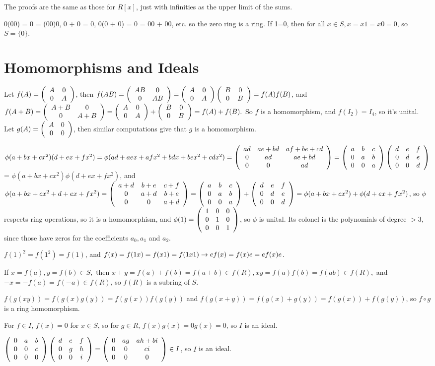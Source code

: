 \documentclass[11pt, oneside]{article}   	%
\begin{document}
\item The proofs are the same as those for $R[x]$, just with infinities as the upper limit of the sums.
\item 0(00) = 0 = (00)0, 0 + 0 = 0, 0(0 + 0) = 0 = 00 + 00, etc. so the zero ring is a ring. If 1=0, then for all $x \in S, x = x1 = x0 = 0$, so $S = \{0\}$.
\ee 
\section{Homomorphisms and Ideals}
\be
\item Let $f(A) = \left( \begin{array}{ccc} A & 0 \\ 0 & A \end{array} \right)$, then $f(AB) = \left( \begin{array}{ccc} AB & 0 \\ 0 & AB \end{array} \right) = \left( \begin{array}{ccc} A & 0 \\ 0 & A \end{array} \right)\left( \begin{array}{ccc} B & 0 \\ 0 & B \end{array} \right) = f(A)f(B)$, and $f(A + B) = \left( \begin{array}{ccc} A+B & 0 \\ 0 & A+B \end{array} \right) =  \left( \begin{array}{ccc} A & 0 \\ 0 & A \end{array} \right) + \left( \begin{array}{ccc} B & 0 \\ 0 & B \end{array} \right) = f(A) + f(B).$ So $f$ is a homomorphism, and $f(I_2) = I_4$, so it's unital. Let $g(A) =  \left( \begin{array}{ccc} A & 0 \\ 0 & 0 \end{array} \right)$, then similar computations give that $g$ is a homomorphism.
\item $\phi(a + bx + cx^2)(d + ex + fx^2) = \phi(ad + aex + afx^2 + bdx + bex^2 + cdx^2) = \left( \begin{array}{ccc} ad & ae + bd & af + be + cd \\ 0 & ad & ae + bd \\ 0 & 0 & ad \end{array} \right) = \left( \begin{array}{ccc} a & b & c \\ 0 & a & b \\ 0 & 0 & a \end{array} \right)\left( \begin{array}{ccc} d & e & f \\ 0 & d & e \\ 0 & 0 & d \end{array} \right)$ = $\phi(a + bx + cx^2)\phi(d+ex+fx^2)$, and $\phi(a + bx + cx^2 + d + ex + fx^2) = \left( \begin{array}{ccc} a+d & b+e & c+f \\ 0 & a+d & b+e \\ 0 & 0 & a+d \end{array} \right) = \left( \begin{array}{ccc} a & b & c \\ 0 & a & b \\ 0 & 0 & a \end{array} \right) + \left( \begin{array}{ccc} d & e & f \\ 0 & d & e \\ 0 & 0 & d \end{array} \right) = \phi(a + bx + cx^2) + \phi(d + ex + fx^2)$, so $\phi$ respects ring operations, so it is a homomorphism, and $\phi(1) = \left( \begin{array}{ccc} 1 & 0 & 0 \\ 0 & 1 & 0 \\ 0 & 0 & 1 \end{array} \right)$, so $\phi$ is unital. Its colonel is the polynomials of degree $> 3$, since those have zeros for the coefficients $a_0, a_1$ and $a_2$.
\item $f(1)^2 = f(1^2) = f(1)$, and $f(x) = f(1x) = f(x1) = f(1x1) \rightarrow ef(x) = f(x)e=ef(x)e$.
\item If $x=f(a), y=f(b) \in S,$ then $x + y = f(a) + f(b) = f(a + b) \in f(R), xy = f(a)f(b) = f(ab) \in f(R), $ and $-x = -f(a) = f(-a) \in f(R)$, so $f(R)$ is a subring of $S$.
\item $f(g(xy)) = f(g(x)g(y)) = f(g(x))f(g(y))$ and $f(g(x + y)) = f(g(x) + g(y)) = f(g(x)) + f(g(y))$, so $f \circ g$ is a ring homomorphism.
\item For $f \in I$, $f(x) = 0$ for $x \in S$, so for $g \in R$, $f(x)g(x) = 0g(x) = 0$, so $I$ is an ideal.
\item $\left( \begin{array}{ccc} 0 & a & b \\ 0 & 0 & c \\ 0 & 0 & 0 \end{array} \right)\left( \begin{array}{ccc} d & e & f \\ 0 & g & h \\ 0 & 0 & i \end{array} \right) = \left( \begin{array}{ccc} 0 & ag & ah + bi \\ 0 & 0 & ci \\ 0 & 0 & 0 \end{array} \right) \in I$, so $I$ is an ideal.
\end{document}
